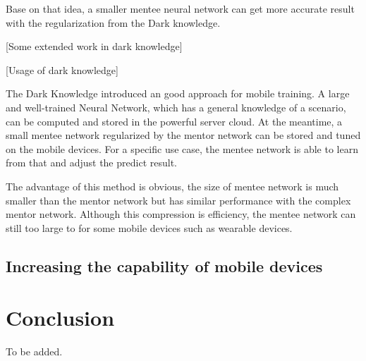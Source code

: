 \documentclass[article]{aaltoseries}
\begin{document}
Base on that idea, a smaller mentee neural network can get more accurate result with the regularization from
the Dark knowledge. 





[Some extended work in dark knowledge]

[Usage of dark knowledge]

The Dark Knowledge introduced an good approach for mobile training. 
A large and well-trained Neural Network, which has a general knowledge of a scenario, can be computed and stored in the powerful server cloud.
At the meantime, a small mentee network regularized by the mentor network can be stored and tuned on the mobile devices.
For a specific use case, the mentee network is able to learn from that and adjust the predict result. 

The advantage of this method is obvious, 
the size of mentee network is much smaller than the mentor network but has similar performance
with the complex mentor network. 
Although this compression is efficiency, the mentee network can still too large to for some mobile
devices such as wearable devices.

\subsection{Increasing the capability of mobile devices}








\section{Conclusion}

To be added.






\end{document}
